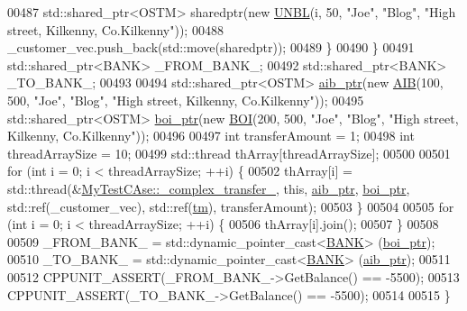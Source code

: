 \begin{DoxyCode}
00487             std::shared\_ptr<OSTM> sharedptr(\textcolor{keyword}{new} \hyperlink{class_u_n_b_l}{UNBL}(i, 50, \textcolor{stringliteral}{"Joe"}, \textcolor{stringliteral}{"Blog"}, \textcolor{stringliteral}{"High street, Kilkenny,
       Co.Kilkenny"}));
00488             \_customer\_vec.push\_back(std::move(sharedptr));
00489         \}
00490     \}
00491     std::shared\_ptr<BANK> \_FROM\_BANK\_;
00492     std::shared\_ptr<BANK> \_TO\_BANK\_;
00493     
00494     std::shared\_ptr<OSTM> \hyperlink{class_my_test_c_ase_adad50e8278b64aa0321000b528e5362c_adad50e8278b64aa0321000b528e5362c}{aib\_ptr}(\textcolor{keyword}{new} \hyperlink{class_a_i_b}{AIB}(100, 500, \textcolor{stringliteral}{"Joe"}, \textcolor{stringliteral}{"Blog"}, \textcolor{stringliteral}{"High street, Kilkenny,
       Co.Kilkenny"}));
00495     std::shared\_ptr<OSTM> \hyperlink{class_my_test_c_ase_a5554de9e3e6393a89c66c036c529720b_a5554de9e3e6393a89c66c036c529720b}{boi\_ptr}(\textcolor{keyword}{new} \hyperlink{class_b_o_i}{BOI}(200, 500, \textcolor{stringliteral}{"Joe"}, \textcolor{stringliteral}{"Blog"}, \textcolor{stringliteral}{"High street, Kilkenny,
       Co.Kilkenny"}));
00496     
00497     \textcolor{keywordtype}{int} transferAmount = 1;
00498     \textcolor{keywordtype}{int} threadArraySize = 10; 
00499     std::thread thArray[threadArraySize];
00500 
00501     \textcolor{keywordflow}{for} (\textcolor{keywordtype}{int} i = 0; i < threadArraySize; ++i) \{
00502         thArray[i] = std::thread(&\hyperlink{class_my_test_c_ase_a2367b87338c4f61cc3ac3193651580d4_a2367b87338c4f61cc3ac3193651580d4}{MyTestCAse::\_complex\_transfer\_}, \textcolor{keyword}{this}, 
      \hyperlink{class_my_test_c_ase_adad50e8278b64aa0321000b528e5362c_adad50e8278b64aa0321000b528e5362c}{aib\_ptr}, \hyperlink{class_my_test_c_ase_a5554de9e3e6393a89c66c036c529720b_a5554de9e3e6393a89c66c036c529720b}{boi\_ptr}, std::ref(\_customer\_vec),  std::ref(\hyperlink{class_my_test_c_ase_a422e6e5d4ddedea384be96031c89b72b_a422e6e5d4ddedea384be96031c89b72b}{tm}), transferAmount);
00503     \}
00504     
00505     \textcolor{keywordflow}{for} (\textcolor{keywordtype}{int} i = 0; i < threadArraySize; ++i) \{
00506         thArray[i].join();
00507     \}
00508     
00509     \_FROM\_BANK\_ = std::dynamic\_pointer\_cast<\hyperlink{class_b_a_n_k}{BANK}> (\hyperlink{class_my_test_c_ase_a5554de9e3e6393a89c66c036c529720b_a5554de9e3e6393a89c66c036c529720b}{boi\_ptr});
00510     \_TO\_BANK\_ = std::dynamic\_pointer\_cast<\hyperlink{class_b_a_n_k}{BANK}> (\hyperlink{class_my_test_c_ase_adad50e8278b64aa0321000b528e5362c_adad50e8278b64aa0321000b528e5362c}{aib\_ptr});
00511     
00512     CPPUNIT\_ASSERT(\_FROM\_BANK\_->GetBalance() == -5500);
00513     CPPUNIT\_ASSERT(\_TO\_BANK\_->GetBalance() == -5500);
00514     
00515 \}
\end{DoxyCode}


